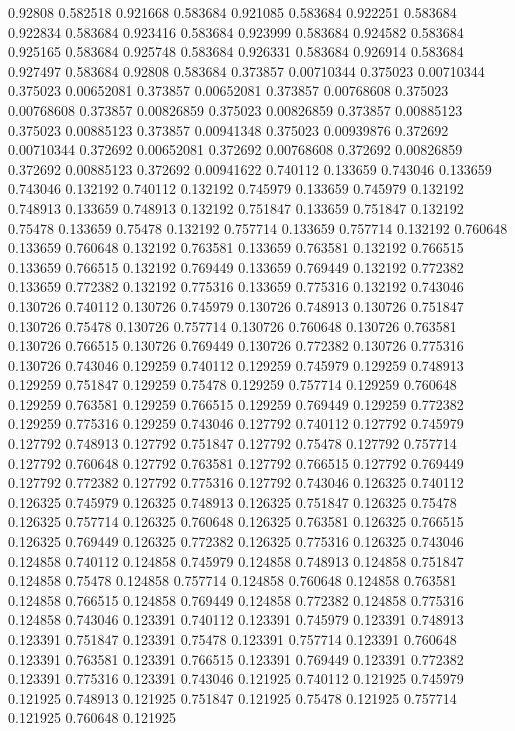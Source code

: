 0.92808 0.582518
0.921668 0.583684
0.921085 0.583684
0.922251 0.583684
0.922834 0.583684
0.923416 0.583684
0.923999 0.583684
0.924582 0.583684
0.925165 0.583684
0.925748 0.583684
0.926331 0.583684
0.926914 0.583684
0.927497 0.583684
0.92808 0.583684
0.373857 0.00710344
0.375023 0.00710344
0.375023 0.00652081
0.373857 0.00652081
0.373857 0.00768608
0.375023 0.00768608
0.373857 0.00826859
0.375023 0.00826859
0.373857 0.00885123
0.375023 0.00885123
0.373857 0.00941348
0.375023 0.00939876
0.372692 0.00710344
0.372692 0.00652081
0.372692 0.00768608
0.372692 0.00826859
0.372692 0.00885123
0.372692 0.00941622
0.740112 0.133659
0.743046 0.133659
0.743046 0.132192
0.740112 0.132192
0.745979 0.133659
0.745979 0.132192
0.748913 0.133659
0.748913 0.132192
0.751847 0.133659
0.751847 0.132192
0.75478 0.133659
0.75478 0.132192
0.757714 0.133659
0.757714 0.132192
0.760648 0.133659
0.760648 0.132192
0.763581 0.133659
0.763581 0.132192
0.766515 0.133659
0.766515 0.132192
0.769449 0.133659
0.769449 0.132192
0.772382 0.133659
0.772382 0.132192
0.775316 0.133659
0.775316 0.132192
0.743046 0.130726
0.740112 0.130726
0.745979 0.130726
0.748913 0.130726
0.751847 0.130726
0.75478 0.130726
0.757714 0.130726
0.760648 0.130726
0.763581 0.130726
0.766515 0.130726
0.769449 0.130726
0.772382 0.130726
0.775316 0.130726
0.743046 0.129259
0.740112 0.129259
0.745979 0.129259
0.748913 0.129259
0.751847 0.129259
0.75478 0.129259
0.757714 0.129259
0.760648 0.129259
0.763581 0.129259
0.766515 0.129259
0.769449 0.129259
0.772382 0.129259
0.775316 0.129259
0.743046 0.127792
0.740112 0.127792
0.745979 0.127792
0.748913 0.127792
0.751847 0.127792
0.75478 0.127792
0.757714 0.127792
0.760648 0.127792
0.763581 0.127792
0.766515 0.127792
0.769449 0.127792
0.772382 0.127792
0.775316 0.127792
0.743046 0.126325
0.740112 0.126325
0.745979 0.126325
0.748913 0.126325
0.751847 0.126325
0.75478 0.126325
0.757714 0.126325
0.760648 0.126325
0.763581 0.126325
0.766515 0.126325
0.769449 0.126325
0.772382 0.126325
0.775316 0.126325
0.743046 0.124858
0.740112 0.124858
0.745979 0.124858
0.748913 0.124858
0.751847 0.124858
0.75478 0.124858
0.757714 0.124858
0.760648 0.124858
0.763581 0.124858
0.766515 0.124858
0.769449 0.124858
0.772382 0.124858
0.775316 0.124858
0.743046 0.123391
0.740112 0.123391
0.745979 0.123391
0.748913 0.123391
0.751847 0.123391
0.75478 0.123391
0.757714 0.123391
0.760648 0.123391
0.763581 0.123391
0.766515 0.123391
0.769449 0.123391
0.772382 0.123391
0.775316 0.123391
0.743046 0.121925
0.740112 0.121925
0.745979 0.121925
0.748913 0.121925
0.751847 0.121925
0.75478 0.121925
0.757714 0.121925
0.760648 0.121925
